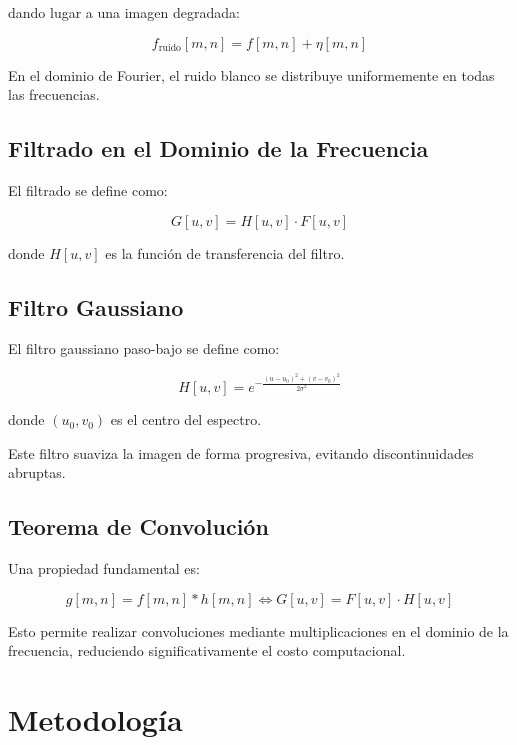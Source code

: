 \documentclass[conference]{IEEEtran}
\begin{document}
	dando lugar a una imagen degradada:
	
	\begin{equation}
		f_{\text{ruido}}[m,n] = f[m,n] + \eta[m,n]
	\end{equation}
	
	En el dominio de Fourier, el ruido blanco se distribuye uniformemente en todas las frecuencias.
	
	\subsection{Filtrado en el Dominio de la Frecuencia}
	
	El filtrado se define como:
	
	\begin{equation}
		G[u,v] = H[u,v] \cdot F[u,v]
	\end{equation}
	
	donde $H[u,v]$ es la función de transferencia del filtro.
	
	\subsection{Filtro Gaussiano}
	
	El filtro gaussiano paso-bajo se define como:
	
	\begin{equation}
		H[u,v] = e^{- \frac{(u-u_0)^2 + (v-v_0)^2}{2\sigma^2}}
	\end{equation}
	
	donde $(u_0, v_0)$ es el centro del espectro.
	
	Este filtro suaviza la imagen de forma progresiva, evitando discontinuidades abruptas.
	
	\subsection{Teorema de Convolución}
	
	Una propiedad fundamental es:
	
	\begin{equation}
		g[m,n] = f[m,n] * h[m,n] \iff G[u,v] = F[u,v] \cdot H[u,v]
	\end{equation}
	
	Esto permite realizar convoluciones mediante multiplicaciones en el dominio de la frecuencia, reduciendo significativamente el costo computacional.
	
	\section{Metodología}
	
\end{document}
